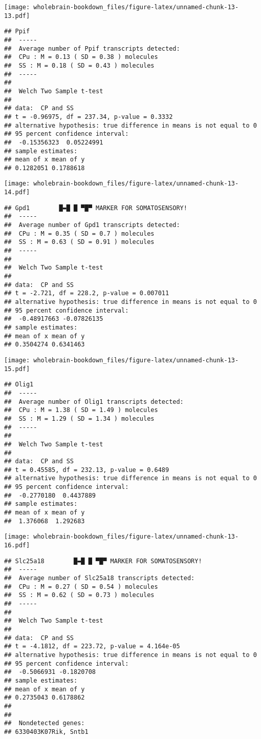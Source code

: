 \documentclass[]{book}
\theoremstyle{definition}
\theoremstyle{definition}
\theoremstyle{remark}
\begin{document}
\texttt{[image: wholebrain-bookdown\_files/figure-latex/unnamed-chunk-13-13.pdf]}

\begin{verbatim}
## Ppif
##  -----
##  Average number of Ppif transcripts detected:
##  CPu : M = 0.13 ( SD = 0.38 ) molecules 
##  SS : M = 0.18 ( SD = 0.43 ) molecules
##  -----
## 
##  Welch Two Sample t-test
## 
## data:  CP and SS
## t = -0.96975, df = 237.34, p-value = 0.3332
## alternative hypothesis: true difference in means is not equal to 0
## 95 percent confidence interval:
##  -0.15356323  0.05224991
## sample estimates:
## mean of x mean of y 
## 0.1282051 0.1788618
\end{verbatim}

\texttt{[image: wholebrain-bookdown\_files/figure-latex/unnamed-chunk-13-14.pdf]}

\begin{verbatim}
## Gpd1        █▬█ █ ▀█▀ MARKER FOR SOMATOSENSORY!
##  -----
##  Average number of Gpd1 transcripts detected:
##  CPu : M = 0.35 ( SD = 0.7 ) molecules 
##  SS : M = 0.63 ( SD = 0.91 ) molecules
##  -----
## 
##  Welch Two Sample t-test
## 
## data:  CP and SS
## t = -2.721, df = 228.2, p-value = 0.007011
## alternative hypothesis: true difference in means is not equal to 0
## 95 percent confidence interval:
##  -0.48917663 -0.07826135
## sample estimates:
## mean of x mean of y 
## 0.3504274 0.6341463
\end{verbatim}

\texttt{[image: wholebrain-bookdown\_files/figure-latex/unnamed-chunk-13-15.pdf]}

\begin{verbatim}
## Olig1
##  -----
##  Average number of Olig1 transcripts detected:
##  CPu : M = 1.38 ( SD = 1.49 ) molecules 
##  SS : M = 1.29 ( SD = 1.34 ) molecules
##  -----
## 
##  Welch Two Sample t-test
## 
## data:  CP and SS
## t = 0.45585, df = 232.13, p-value = 0.6489
## alternative hypothesis: true difference in means is not equal to 0
## 95 percent confidence interval:
##  -0.2770180  0.4437889
## sample estimates:
## mean of x mean of y 
##  1.376068  1.292683
\end{verbatim}

\texttt{[image: wholebrain-bookdown\_files/figure-latex/unnamed-chunk-13-16.pdf]}

\begin{verbatim}
## Slc25a18        █▬█ █ ▀█▀ MARKER FOR SOMATOSENSORY!
##  -----
##  Average number of Slc25a18 transcripts detected:
##  CPu : M = 0.27 ( SD = 0.54 ) molecules 
##  SS : M = 0.62 ( SD = 0.73 ) molecules
##  -----
## 
##  Welch Two Sample t-test
## 
## data:  CP and SS
## t = -4.1812, df = 223.72, p-value = 4.164e-05
## alternative hypothesis: true difference in means is not equal to 0
## 95 percent confidence interval:
##  -0.5066931 -0.1820708
## sample estimates:
## mean of x mean of y 
## 0.2735043 0.6178862 
## 
## 
##  Nondetected genes: 
## 6330403K07Rik, Sntb1
\end{verbatim}
\end{document}
